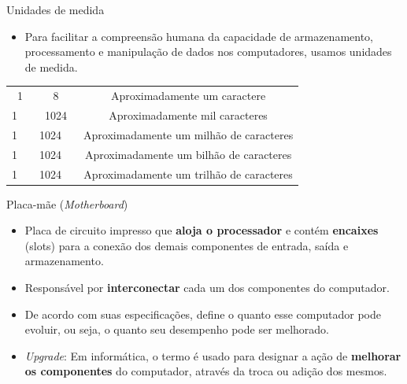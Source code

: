 \begin{frame}{Unidades de medida}
	\begin{block}{}
		\begin{itemize}
			\item Para facilitar a compreensão humana da capacidade de armazenamento, processamento e manipulação de dados nos computadores, usamos unidades de medida.
		\end{itemize}
	\end{block}

	\bigskip

	\centering
	\begin{tabular}{ccc}
		\toprule
		\SI{1}{\byte}      & \SI{8}{\bit}          & Aproximadamente um caractere             \\
		\SI{1}{\kilo\byte} & \SI{1024}{\byte}      & Aproximadamente mil caracteres           \\
		\SI{1}{\mega\byte} & \SI{1024}{\kilo\byte} & Aproximadamente um milhão de caracteres  \\
		\SI{1}{\giga\byte} & \SI{1024}{\mega\byte} & Aproximadamente um bilhão de caracteres  \\
		\SI{1}{\tera\byte} & \SI{1024}{\giga\byte} & Aproximadamente um trilhão de caracteres \\ \bottomrule
	\end{tabular}

\end{frame}


\begin{frame}{Placa-mãe (\textit{Motherboard})}
	\begin{block}{}
		\begin{itemize}
			\item Placa de circuito impresso que \textbf{aloja o processador} e contém \textbf{encaixes} (slots) para a conexão dos demais componentes de entrada, saída e armazenamento.
			\item Responsável por \textbf{interconectar} cada um dos componentes do computador.
			\item De acordo com suas especificações, define o quanto esse computador pode evoluir, ou seja, o quanto seu desempenho pode ser melhorado.
			\item \textit{Upgrade}: Em informática, o termo é usado para designar a ação de \textbf{melhorar os componentes} do computador, através da troca ou adição dos mesmos.
		\end{itemize}
	\end{block}
\end{frame}


